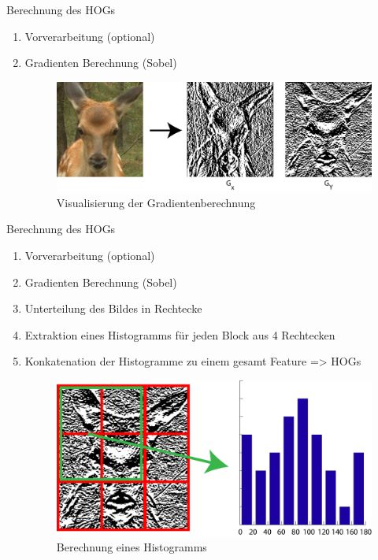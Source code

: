\begin{frame}[t,fragile]{Berechnung des HOGs}
	\begin{enumerate}
 		\item Vorverarbeitung (optional)
		\item Gradienten Berechnung (Sobel)

	\begin{figure}
		\centering
		\includegraphics[scale=0.12]{img/sobel.png}
		\caption{Visualisierung der Gradientenberechnung }
	\end{figure}
  \end{enumerate}
\end{frame}

\begin{frame}[t,fragile]{Berechnung des HOGs}
	\begin{enumerate}
 		\item Vorverarbeitung (optional)
		\item Gradienten Berechnung (Sobel)
		\item Unterteilung des Bildes in Rechtecke
		\item Extraktion eines Histogramms für jeden Block aus 4 Rechtecken
		\item Konkatenation der Histogramme zu einem gesamt Feature => HOGs
	\begin{figure}
		\centering
		\includegraphics[scale=0.12]{img/sobel2hog.png}
		\caption{Berechnung eines Histogramms}
	\end{figure}
  \end{enumerate}
\end{frame}

